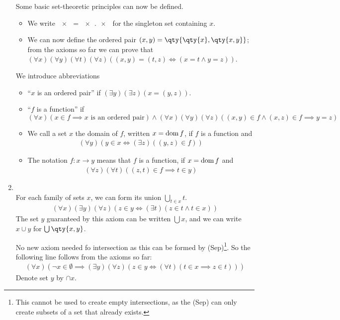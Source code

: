 \begin{enumerate}
    Some basic set-theoretic principles can now be defined.
    \begin{itemize}
        \item We write $\qty{x} = \qty{x, x}$ for the singleton set containing $x$.
        \item We can now define the ordered pair $(x, y) = \qty{\qty{x}, \qty{x, y}}$; from the axioms so far we can prove that $(\forall x) (\forall y) (\forall t) (\forall z) ((x, y) = (t, z) \iff (x = t \wedge y = z))$.
    \end{itemize}

    We introduce abbreviations
    \begin{itemize}
        \item ``$x$ is an ordered pair'' if $(\exists y)(\exists z)(x = (y,z))$.
        \item ``$f$ is a function'' if $(\forall x)(x \in f \implies x \text{ is an ordered pair}) \wedge (\forall x)(\forall y)(\forall z)((x,y) \in f \wedge (x,z) \in f \implies y = z)$
        \item We call a set $x$ the domain of $f$, written $x = \operatorname{dom} f$, if $f$ is a function and
        \begin{align*}
            (\forall y)(y \in x \Leftrightarrow (\exists z)((y,z) \in f))
        \end{align*}
        \item The notation $f \colon x \to y$ means that $f$ is a function, if $x = \operatorname{dom} f$ and
        \begin{align*}
            (\forall z)(\forall t)((z, t) \in f \implies t \in y)
        \end{align*}
    \end{itemize}

    \item {} \\
    For each family of sets $x$, we can form its union $\bigcup_{t \in x} t$.
    \begin{align*}
        (\forall x)(\exists y)(\forall z)(z \in y \Leftrightarrow (\exists t)(z \in t \wedge t \in x))
    \end{align*}
    The set $y$ guaranteed by this axiom can be written $\bigcup x$, and we can write $x \cup y$ for $\bigcup \qty{x, y}$.

    \begin{remark}
        No new axiom needed fo intersection as this can be formed by (Sep)\footnote{This cannot be used to create empty intersections, as the (Sep) can only create subsets of a set that already exists.}.
        So the following line follows from the axioms so far:
        \begin{align*}
            (\forall x)(\neg x \in \emptyset \implies (\exists y)(\forall z)(z \in y \iff (\forall t)(t \in x \implies z \in t)))
        \end{align*}
        Denote set $y$ by $\cap x$.


\end{remark}
\end{enumerate}
